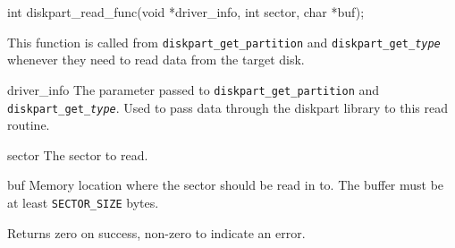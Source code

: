 \begin{apisyn}

        \funcproto int diskpart_read_func(void *driver_info, 
			int sector, char *buf);
\end{apisyn}
\begin{apidesc}
        This function is called from {\tt diskpart_get_partition} and
	{\tt diskpart_get_\emph{type}} whenever they need to read data from
	the target disk.
\end{apidesc}
\begin{apiparm}
        \item[driver_info]
                The parameter passed to {\tt diskpart_get_partition} and
		{\tt diskpart_get_\emph{type}}.  Used to pass data through
		the diskpart library to this read routine.
	\item[sector]
		The sector to read.
	\item[buf]
		Memory location where the sector should be read in to.
		The buffer must be at least {\tt SECTOR_SIZE} bytes.
\end{apiparm}
\begin{apiret}
	Returns zero on success, non-zero to indicate an error.
\end{apiret}


